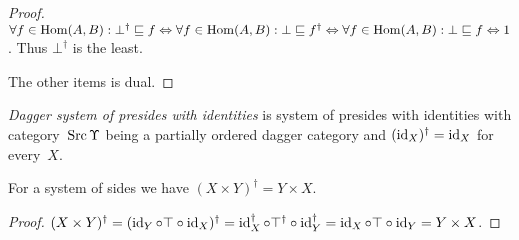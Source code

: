\begin{proof}
$\forall f\in\operatorname{Hom}(A,B):\bot^\dagger\sqsubseteq f \Leftrightarrow
\forall f\in\operatorname{Hom}(A,B):\bot\sqsubseteq f^\dagger \Leftrightarrow
\forall f\in\operatorname{Hom}(A,B):\bot\sqsubseteq f \Leftrightarrow 1$. Thus $\bot^\dagger$ is the least.

The other items is dual.
\end{proof}

\begin{defn}
\emph{Dagger system of presides with identities} is system of presides with identities with category~$\operatorname{Src}\Upsilon$ being
a partially ordered dagger category
and $(\operatorname{id}_X)^\dagger = \operatorname{id}_X$ for every~$X$.
\end{defn}

\begin{prop}
For a system of sides we have $(X\times Y)^\dagger = Y\times X$.
\end{prop}

\begin{proof}
$(X\times Y)^\dagger = (\operatorname{id}_Y\circ\top\circ\operatorname{id}_X)^\dagger = \operatorname{id}_X^\dagger\circ\top^\dagger\circ\operatorname{id}_Y^\dagger =
\operatorname{id}_X\circ\top\circ\operatorname{id}_Y = Y\times X$.
\end{proof}


